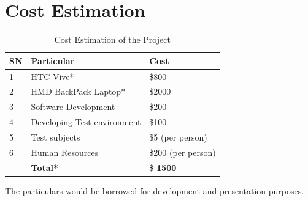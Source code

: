 \documentclass[12pt]{article}
\begin{document}
\section{Cost Estimation}
\begin{table}[!ht]
\centering
\begin{tabular} { |l | l | l |}
\hline
SN & Particular & Cost \\ \hline
1  & HTC Vive*    &  \$800 \\ \hline
2 & HMD BackPack Laptop*  & \$2000 \\ \hline
3 & Software Development & \$200 \\ \hline
4 & Developing Test environment & \$100 \\ \hline
5 &  Test subjects  & \$5 (per person) \\ \hline
6 & Human Resources & \$200 (per person) \\ \hline
 & \textbf{Total*} & \$ \textbf{1500}\\ \hline
\end{tabular}
\caption{Cost Estimation of the Project}
\end{table}
\small * The particulars would be borrowed for development and presentation purposes. 

\clearpage
\end{document}
